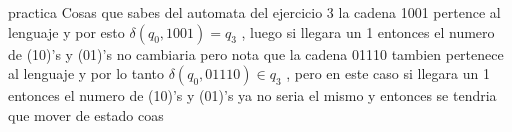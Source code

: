 \documentclass[12p]{article}
\begin{document}
practica
Cosas que sabes del automata del ejercicio 3
la cadena 1001 pertence al lenguaje y por esto $ \delta(q_0 , 1001) = q _ 3$ , luego si llegara un 1 entonces el numero de (10)'s y (01)'s no cambiaria
pero nota que la cadena 01110 tambien pertenece al lenguaje y por lo tanto $\delta(q_0 , 01110) \in q_3 $ , pero en este caso si llegara un 1 \\
entonces el numero de (10)'s y (01)'s ya no seria el mismo y entonces se tendria que mover de estado
coas
\end{document}
